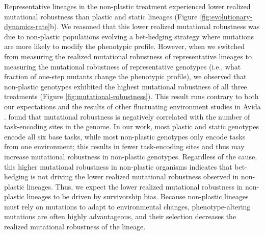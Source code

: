 Representative lineages in the non-plastic treatment experienced lower realized mutational robustness than plastic and static lineages (Figure \ref{fig:evolutionary-dynamics-rate}b).
We reasoned that this lower realized mutational robustness was due to non-plastic populations evolving a bet-hedging strategy where mutations are more likely to modify the phenotypic profile. 
However, when we switched from measuring the realized mutational robustness of representative lineages to measuring the mutational robustness of representative genotypes (i.e., what fraction of one-step mutants change the phenotypic profile), we observed that non-plastic genotypes exhibited the highest mutational robustness of all three treatments (Figure \ref{fig:mutational-robustness}).
This result runs contrary to both our expectations and the results of other fluctuating environment studies in Avida \citep{canino-koning_fluctuating_2019}.
\cite{canino-koning_fluctuating_2019} found that mutational robustness is negatively correlated with the number of task-encoding sites in the genome.
In our work, most plastic and static genotypes encode all six base tasks, while most non-plastic genotypes only encode tasks from one environment; this results in fewer task-encoding sites and thus may increase mutational robustness in non-plastic genotypes. %
Regardless of the cause, this higher mutational robustness in non-plastic organisms indicates that bet-hedging is not driving the lower realized mutational robustness observed in non-plastic lineages.
Thus, we expect the lower realized mutational robustness in non-plastic lineages to be driven by survivorship bias. 
Because non-plastic lineages must rely on mutations to adapt to environmental changes, phenotype-altering mutations are often highly advantageous, and their selection decreases the realized mutational robustness of the lineage. 


